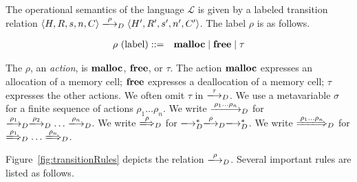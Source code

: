 The operational semantics of the language \(\mathcal{L}\) is given by
a labeled transition relation \(\langle H, R, s, n, C \rangle
\xlongrightarrow{\rho}_D \langle H', R', s', n', C' \rangle\). The label
\(\rho\) is as follows.

\begin{eqnarray*}
 \rho \mbox{ (label)} &::=& \Malloc \mid \Free \mid \tau %
\end{eqnarray*}

The \(\rho\), an \emph{action}, is \(\mathbf{malloc}\), \(\mathbf{free}\), or
\(\tau\).  The action \(\mathbf{malloc}\) expresses an allocation of a memory
cell; \(\mathbf{free}\) expresses a deallocation of a memory cell; \(\tau\)
expresses the other actions.  We often omit \(\tau\) in
\(\xlongrightarrow{\tau}_D\).  We use a metavariable \(\sigma\) for a
finite sequence of actions \(\rho_1\dots\rho_n\).  We write
\(\xlongrightarrow{\rho_1\dots\rho_n}_D\) for
\(\xlongrightarrow{\rho_1}_D\xlongrightarrow{\rho_2}_D\dots\xlongrightarrow{\rho_n}_D\).
We write \(\xLongrightarrow{\rho}_D\) for
\(\xlongrightarrow{}_D^*\xlongrightarrow{\rho}_D\xlongrightarrow{}_D^*\).
We write \(\xLongrightarrow{\rho_1\dots\rho_n}_D\) for
\(\xLongrightarrow{\rho_1}_D\dots\xLongrightarrow{\rho_n}_D\).

Figure~\ref{fig:transitionRules} depicts the relation
\(\xlongrightarrow{\rho}_D\). Several important rules are listed as
follows.

